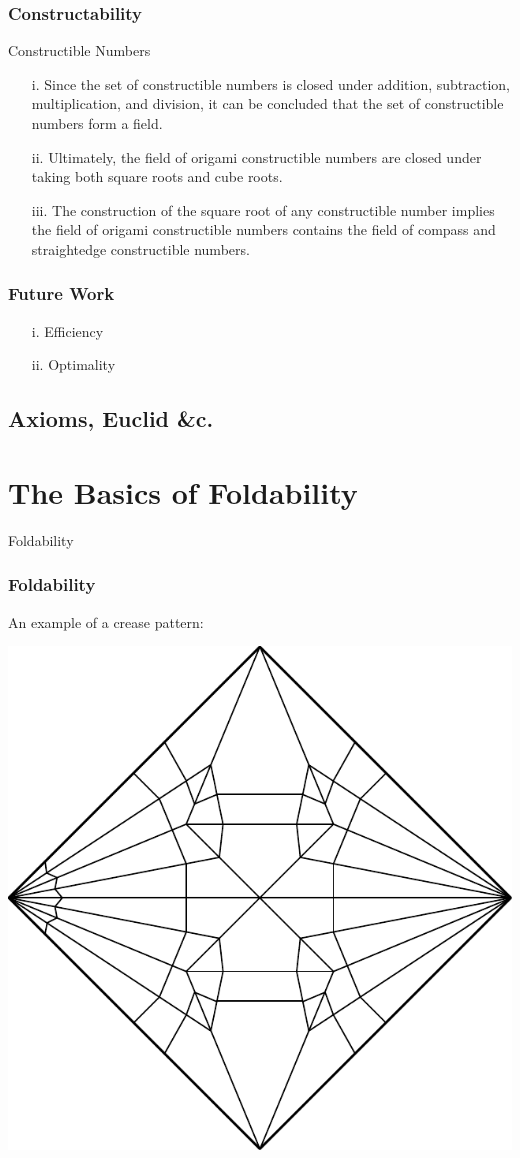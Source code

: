 \documentclass{beamer}
\begin{document}
\begin{frame}
\frametitle{Constructability}
\begin{block}{Constructible Numbers}
\begin{enumerate}
\item[i.]
Since the set of constructible numbers is closed under addition, subtraction, multiplication, and division, it can be concluded that the set of constructible numbers form a field.
\item[ii.]
Ultimately, the field of origami constructible numbers are closed under taking both square roots and cube roots.
\item[iii.]
The construction of the square root of any constructible number implies the field of origami constructible numbers contains the field of compass and straightedge constructible numbers.
\end{enumerate}
\end{block}
\end{frame}

\begin{frame}
\frametitle{Future Work}
\begin{enumerate}
\item[i.]
Efficiency
\item[ii.]
Optimality
\end{enumerate}
\end{frame}

\subsection{Axioms, Euclid \&c.}

\section{The Basics of Foldability}

\begin{frame}
\Huge{\centerline{Foldability}}
\end{frame}

\begin{frame}
\frametitle{Foldability}
\begin{block}{}
An example of a crease pattern:
\end{block}
\begin{center}
\includegraphics[width=.5\textwidth]{foldability_pix/crane-unassigned.pdf}
\end{center}
\end{frame}
\end{document}
